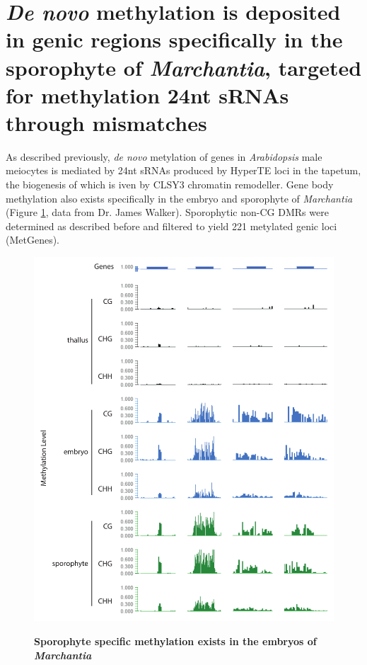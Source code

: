 \section{\textit{De novo} methylation is deposited in genic regions specifically in the sporophyte of \textit{Marchantia}, targeted for methylation 24nt sRNAs through mismatches}

As described previously, \textit{de novo} metylation of genes in \textit{Arabidopsis} male meiocytes is mediated by 24nt sRNAs produced by HyperTE loci in the tapetum, the biogenesis of which is iven by CLSY3 chromatin remodeller. Gene body methylation also exists specifically in the embryo and sporophyte of \textit{Marchantia} (Figure \ref{fig:SLM_examples}, data from Dr. James Walker). Sporophytic non-CG DMRs were determined as described before\citep{jimmythesis} and filtered to yield 221 metylated genic loci (MetGenes).

\begin{figure}[htbp!] 
\centering    
    \includegraphics[width=1\textwidth]{Chapter3/Figs/Figure4_SLM_examples.pdf}
\caption{\textbf{Sporophyte specific methylation exists in the embryos of \textit{Marchantia}}}
\label{fig:SLM_examples}
\captionsetup{font=small}
    \caption*{}
\end{figure}

